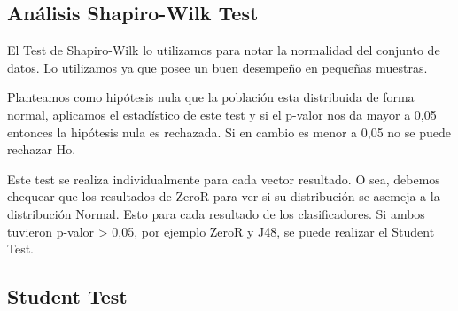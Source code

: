 \subsection{Análisis Shapiro-Wilk Test}



El Test de Shapiro-Wilk lo utilizamos para notar la normalidad del conjunto de datos. Lo utilizamos ya que posee un buen desempeño en pequeñas muestras.


Planteamos como hipótesis nula que la población esta distribuida de forma normal, aplicamos el estadístico de este test y si el p-valor nos da mayor a 0,05 entonces la hipótesis nula es rechazada. Si en cambio es menor a 0,05 no se puede rechazar Ho.

Este test se realiza individualmente para cada vector resultado. O sea, debemos chequear que los resultados de ZeroR para ver si su distribución se asemeja a la distribución Normal. Esto para cada resultado de los clasificadores. Si ambos tuvieron p-valor > 0,05, por ejemplo ZeroR y J48, se puede realizar el Student Test. 

\subsection{Student Test}


